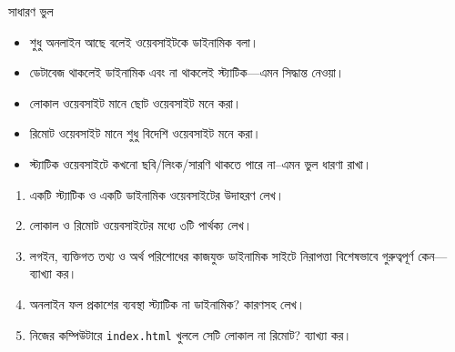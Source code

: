 \begin{mistakebox}{সাধারণ ভুল}
\begin{itemize}
\item শুধু অনলাইন আছে বলেই ওয়েবসাইটকে ডাইনামিক বলা।
\item ডেটাবেজ থাকলেই ডাইনামিক এবং না থাকলেই স্ট্যাটিক—এমন সিদ্ধান্ত নেওয়া।
\item লোকাল ওয়েবসাইট মানে ছোট ওয়েবসাইট মনে করা।
\item রিমোট ওয়েবসাইট মানে শুধু বিদেশি ওয়েবসাইট মনে করা।
\item স্ট্যাটিক ওয়েবসাইটে কখনো ছবি/লিংক/সারণি থাকতে পারে না--এমন ভুল ধারণা রাখা।
\end{itemize}
\end{mistakebox}


\begin{practicebox}
\begin{enumerate}
\item একটি স্ট্যাটিক ও একটি ডাইনামিক ওয়েবসাইটের উদাহরণ লেখ।
\item লোকাল ও রিমোট ওয়েবসাইটের মধ্যে ৩টি পার্থক্য লেখ।
\item লগইন, ব্যক্তিগত তথ্য ও অর্থ পরিশোধের কাজযুক্ত ডাইনামিক সাইটে নিরাপত্তা বিশেষভাবে গুরুত্বপূর্ণ কেন—ব্যাখ্যা কর।
\item অনলাইন ফল প্রকাশের ব্যবস্থা স্ট্যাটিক না ডাইনামিক? কারণসহ লেখ।
\item নিজের কম্পিউটারে \texttt{index.html} খুললে সেটি লোকাল না রিমোট? ব্যাখ্যা কর।
\end{enumerate}
\end{practicebox}
